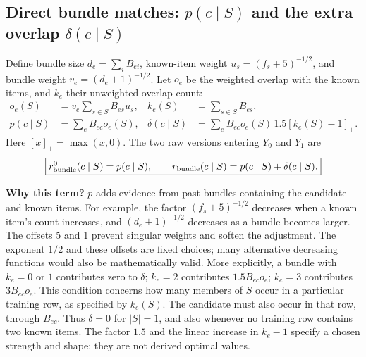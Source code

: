 \documentclass[11pt,a4paper]{article}
\newcommand{\why}{\par\textbf{Why this term?} }
\numberwithin{equation}{section}
\begin{document}
\subsection{Direct bundle matches: $p(c\mid S)$ and the extra overlap $\delta(c\mid S)$}
Define bundle size $d_e=\sum_i B_{ei}$, known-item weight
$u_s=(f_s+5)^{-1/2}$, and bundle weight $v_e=(d_e+1)^{-1/2}$. Let $o_e$ be the weighted
overlap with the known items, and $k_e$ their unweighted overlap count:
\begin{align}
 o_e(S)&=v_e\sum_{s\in S}B_{es}u_s,& k_e(S)&=\sum_{s\in S}B_{es},\\
 p(c\mid S)&=\sum_e B_{ec}o_e(S),&
 \delta(c\mid S)&=\sum_e B_{ec}o_e(S)\,1.5[k_e(S)-1]_+ .\label{delta}
\end{align}
Here $[x]_+=\max(x,0)$. The two raw versions entering $Y_0$ and $Y_1$ are
\begin{equation}\label{bundle}
 \boxed{r_{\rm bundle}^0(c\mid S)=p(c\mid S),\qquad
 r_{\rm bundle}(c\mid S)=p(c\mid S)+\delta(c\mid S).}
\end{equation}
\why $p$ adds evidence from past bundles containing the candidate and known items.
For example, the factor $(f_s+5)^{-1/2}$ decreases when a known item's count increases,
and $(d_e+1)^{-1/2}$ decreases as a bundle becomes larger. The offsets 5 and 1 prevent
singular weights and soften the adjustment. The exponent $1/2$ and these offsets are
fixed choices; many alternative decreasing functions would also be mathematically valid. More explicitly, a bundle with $k_e=0$ or $1$ contributes zero to $\delta$; $k_e=2$
contributes $1.5 B_{ec}o_e$; $k_e=3$ contributes $3 B_{ec}o_e$. This condition concerns
how many members of $S$ occur in a particular training row, as specified by $k_e(S)$.
The candidate must also occur in that row, through $B_{ec}$. Thus $\delta=0$ for $|S|=1$,
and also whenever no training row contains two known items. The factor $1.5$ and the linear
increase in $k_e-1$ specify a chosen strength and shape; they are not derived optimal values.
\end{document}
